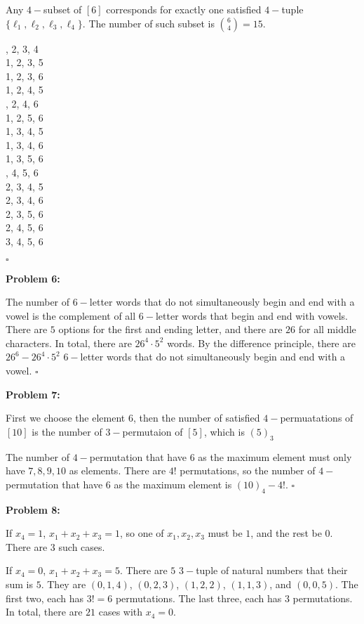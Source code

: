 \documentclass[12pt]{article}
\begin{document}
Any $4-$subset of $[6]$ corresponds for exactly one satisfied $4-$tuple $\{\ell_1, \ell_2, \ell_3, \ell_4\}$. The number of such subset is $\binom{6}{4} = 15$.

\begin{multicols}{3}
, 2, 3, 4\\
1, 2, 3, 5\\
1, 2, 3, 6\\
1, 2, 4, 5\\
, 2, 4, 6\\
1, 2, 5, 6\\
1, 3, 4, 5\\
1, 3, 4, 6\\
1, 3, 5, 6\\
, 4, 5, 6\\
2, 3, 4, 5\\
2, 3, 4, 6\\
2, 3, 5, 6\\
2, 4, 5, 6\\
3, 4, 5, 6
\end{multicols}
$\square$

\textbf{Problem 6:}

The number of $6-$letter words that do not simultaneously begin and end with a vowel is the complement of all $6-$letter words that begin and end with vowels. There are $5$ options for the first and ending letter, and there are $26$ for all middle characters. In total, there are $26^4 \cdot 5^2$ words. By the difference principle, there are $26^6 - 26^4 \cdot 5^2$ $6-$letter words that do not simultaneously begin and end with a vowel. $\square$

\textbf{Problem 7:}

First we choose the element $6$, then the number of satisfied $4-$permuatations of $[10]$ is the number of $3-$permutaion of $[5]$, which is $(5)_3$

The number of $4-$permutation that have $6$ as the maximum element must only have $7, 8, 9, 10$ as elements. There  are $4!$ permutations, so the number of $4-$permutation that have $6$ as the maximum element is $(10)_4 - 4!$. $\square$

\textbf{Problem 8:}

If $x_4 = 1$, $x_1+x_2+x_3 = 1$, so one of $x_1, x_2, x_3$ must be $1$, and the rest be $0$. There are $3$ such cases.

If $x_4 = 0$, $x_1+x_2+x_3 = 5$. There are $5$ $3-$tuple of natural numbers that their sum is $5$. They are $(0, 1, 4)$, $(0, 2, 3)$, $(1,2,2)$, $(1,1,3)$, and $(0,0,5)$. The first two, each has $3!=6$ permutations. The last three, each has $3$ permutations. In total, there are $21$ cases with $x_4= 0$.
\end{document}

